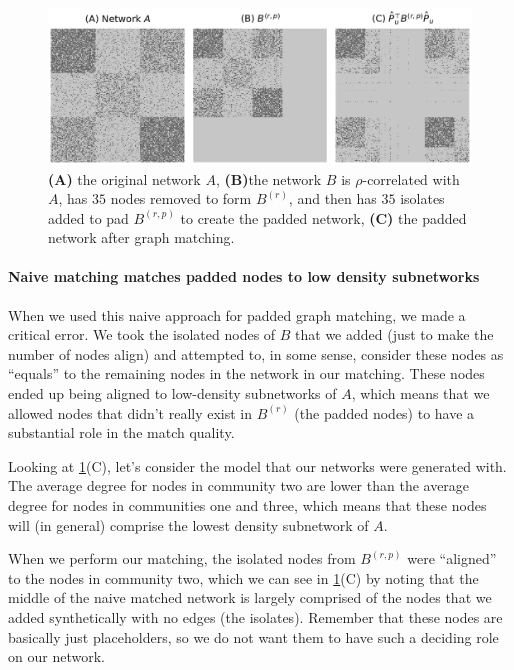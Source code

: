 \begin{figure}
    \centering
    \includegraphics[width=\linewidth]{applications/ch8/Images/gm_naive.png}
    \caption[Naive padded graph matching]{\textbf{(A)} the original network $A$, \textbf{(B)}the network $B$ is $\rho$-correlated with $A$, has $35$ nodes removed to form $B^{(r)}$, and then has $35$ isolates added to pad $B^{(r,p)}$ to create the padded network, \textbf{(C)} the padded network after graph matching.}
    \label{fig:ch8:gm:sgm:naive_padded}
\end{figure}

\paragraph*{Naive matching matches padded nodes to low density subnetworks}

When we used this naive approach for padded graph matching, we made a critical error. We took the isolated nodes of $B$ that we added (just to make the number of nodes align) and attempted to, in some sense, consider these nodes as ``equals'' to the remaining nodes in the network in our matching. These nodes ended up being aligned to low-density subnetworks of $A$, which means that we allowed nodes that didn't really exist in $B^{(r)}$ (the padded nodes) to have a substantial role in the match quality. 

Looking at \ref{fig:ch8:gm:sgm:naive_padded}(C), let's consider the model that our networks were generated with. The average degree for nodes in community two are lower than the average degree for nodes in communities one and three, which means that these nodes will (in general) comprise the lowest density subnetwork of $A$. 

When we perform our matching, the isolated nodes from $B^{(r, p)}$ were ``aligned'' to the nodes in community two, which we can see in \ref{fig:ch8:gm:sgm:naive_padded}(C) by noting that the middle of the naive matched network is largely comprised of the nodes that we added synthetically with no edges (the isolates). Remember that these nodes are basically just placeholders, so we do not want them to have such a deciding role on our network.

